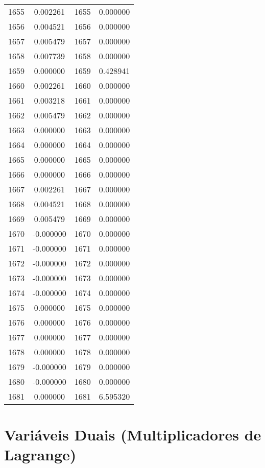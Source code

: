 \documentclass[12pt]{article}
\begin{document}
\begin{longtable}{@{}cccc@{}}
1655 & 0.002261 & 1655 & 0.000000 \\
1656 & 0.004521 & 1656 & 0.000000 \\
1657 & 0.005479 & 1657 & 0.000000 \\
1658 & 0.007739 & 1658 & 0.000000 \\
1659 & 0.000000 & 1659 & 0.428941 \\
1660 & 0.002261 & 1660 & 0.000000 \\
1661 & 0.003218 & 1661 & 0.000000 \\
1662 & 0.005479 & 1662 & 0.000000 \\
1663 & 0.000000 & 1663 & 0.000000 \\
1664 & 0.000000 & 1664 & 0.000000 \\
1665 & 0.000000 & 1665 & 0.000000 \\
1666 & 0.000000 & 1666 & 0.000000 \\
1667 & 0.002261 & 1667 & 0.000000 \\
1668 & 0.004521 & 1668 & 0.000000 \\
1669 & 0.005479 & 1669 & 0.000000 \\
1670 & -0.000000 & 1670 & 0.000000 \\
1671 & -0.000000 & 1671 & 0.000000 \\
1672 & -0.000000 & 1672 & 0.000000 \\
1673 & -0.000000 & 1673 & 0.000000 \\
1674 & -0.000000 & 1674 & 0.000000 \\
1675 & 0.000000 & 1675 & 0.000000 \\
1676 & 0.000000 & 1676 & 0.000000 \\
1677 & 0.000000 & 1677 & 0.000000 \\
1678 & 0.000000 & 1678 & 0.000000 \\
1679 & -0.000000 & 1679 & 0.000000 \\
1680 & -0.000000 & 1680 & 0.000000 \\
1681 & 0.000000 & 1681 & 6.595320 \\

\end{longtable}

\section{Variáveis Duais (Multiplicadores de Lagrange)}
\end{document}
